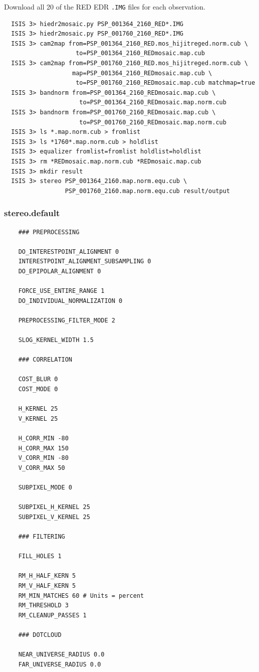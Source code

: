 Download all 20 of the RED EDR \texttt{.IMG} files for each observation.
\begin{verbatim}
  ISIS 3> hiedr2mosaic.py PSP_001364_2160_RED*.IMG
  ISIS 3> hiedr2mosaic.py PSP_001760_2160_RED*.IMG
  ISIS 3> cam2map from=PSP_001364_2160_RED.mos_hijitreged.norm.cub \
                    to=PSP_001364_2160_REDmosaic.map.cub
  ISIS 3> cam2map from=PSP_001760_2160_RED.mos_hijitreged.norm.cub \
                   map=PSP_001364_2160_REDmosaic.map.cub \
                    to=PSP_001760_2160_REDmosaic.map.cub matchmap=true
  ISIS 3> bandnorm from=PSP_001364_2160_REDmosaic.map.cub \
                     to=PSP_001364_2160_REDmosaic.map.norm.cub
  ISIS 3> bandnorm from=PSP_001760_2160_REDmosaic.map.cub \
                     to=PSP_001760_2160_REDmosaic.map.norm.cub
  ISIS 3> ls *.map.norm.cub > fromlist
  ISIS 3> ls *1760*.map.norm.cub > holdlist
  ISIS 3> equalizer fromlist=fromlist holdlist=holdlist
  ISIS 3> rm *REDmosaic.map.norm.cub *REDmosaic.map.cub
  ISIS 3> mkdir result
  ISIS 3> stereo PSP_001364_2160.map.norm.equ.cub \
                 PSP_001760_2160.map.norm.equ.cub result/output
\end{verbatim}

\subsubsection*{stereo.default}
\begin{verbatim}
    ### PREPROCESSING

    DO_INTERESTPOINT_ALIGNMENT 0
    INTERESTPOINT_ALIGNMENT_SUBSAMPLING 0
    DO_EPIPOLAR_ALIGNMENT 0

    FORCE_USE_ENTIRE_RANGE 1
    DO_INDIVIDUAL_NORMALIZATION 0

    PREPROCESSING_FILTER_MODE 2

    SLOG_KERNEL_WIDTH 1.5

    ### CORRELATION

    COST_BLUR 0
    COST_MODE 0

    H_KERNEL 25
    V_KERNEL 25

    H_CORR_MIN -80
    H_CORR_MAX 150
    V_CORR_MIN -80
    V_CORR_MAX 50

    SUBPIXEL_MODE 0

    SUBPIXEL_H_KERNEL 25
    SUBPIXEL_V_KERNEL 25

    ### FILTERING

    FILL_HOLES 1

    RM_H_HALF_KERN 5
    RM_V_HALF_KERN 5
    RM_MIN_MATCHES 60 # Units = percent
    RM_THRESHOLD 3
    RM_CLEANUP_PASSES 1

    ### DOTCLOUD

    NEAR_UNIVERSE_RADIUS 0.0
    FAR_UNIVERSE_RADIUS 0.0
\end{verbatim}

